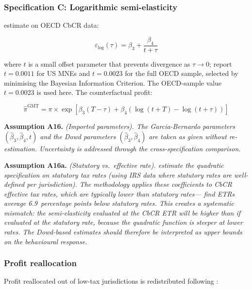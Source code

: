 \documentclass[11pt,a4paper]{article}
\newcommand{\assumption}[2]{\noindent\textbf{Assumption #1.} \textit{#2}\medskip}
\begin{document}
\subsubsection{Specification C: Logarithmic semi-elasticity}

\citet{garcia-bernardo2024} estimate on OECD CbCR data:

\begin{equation}\label{eq:garcia_se}
\varepsilon_{\log}(\tau) = \beta_3 + \frac{\beta_4}{t + \tau}
\end{equation}

where $t$ is a small offset parameter that prevents divergence as $\tau \to 0$; \citet{garcia-bernardo2024} report $t = 0.0011$ for US MNEs and $t = 0.0023$ for the full OECD sample, selected by minimising the Bayesian Information Criterion. The OECD-sample value $t = 0.0023$ is used here. The counterfactual profit:

\begin{equation}\label{eq:garcia_response}
\hat{\pi}^{\text{GMT}} = \pi \times \exp\!\left[\beta_3(T - \tau) + \beta_4\left(\log(t + T) - \log(t + \tau)\right)\right]
\end{equation}

\assumption{A16}{(Imported parameters). The Garcia-Bernardo parameters $(\hat{\beta}_3, \hat{\beta}_4, t)$ and the Dowd parameters $(\hat{\beta}_3, \hat{\beta}_4)$ are taken as given without re-estimation. Uncertainty is addressed through the cross-specification comparison.}

\assumption{A16a}{(Statutory vs.\ effective rate). \citet{dowd2017} estimate the quadratic specification on \emph{statutory} tax rates (using IRS data where statutory rates are well-defined per jurisdiction). The methodology applies these coefficients to CbCR \emph{effective} tax rates, which are typically lower than statutory rates---\citet{hugger2026} find ETRs average 6.9~percentage points below statutory rates. This creates a systematic mismatch: the semi-elasticity evaluated at the CbCR ETR will be higher than if evaluated at the statutory rate, because the quadratic function is steeper at lower rates. The Dowd-based estimates should therefore be interpreted as upper bounds on the behavioural response.}

\subsubsection{Profit reallocation}

Profit reallocated out of low-tax jurisdictions is redistributed following \citet{garcia-bernardo2024}:
\end{document}

